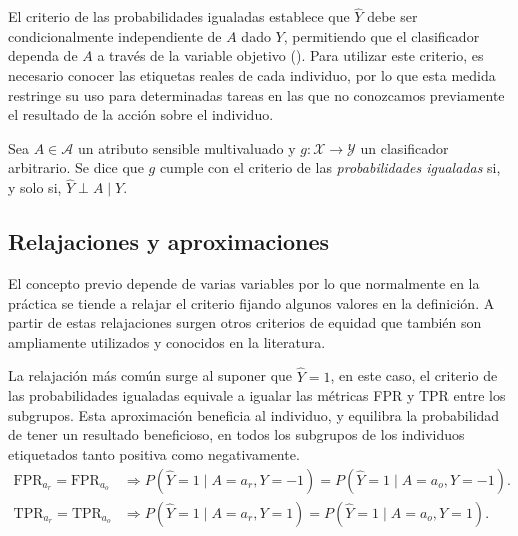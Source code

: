\documentclass[oneside,openright,titlepage,numbers=noenddot,openany,headinclude,footinclude=true,
cleardoublepage=empty,abstractoff,BCOR=5mm,paper=a4,fontsize=12pt,main=spanish]{scrreprt}
\begin{document}
El criterio de las probabilidades igualadas establece que $\hat{Y}$ debe ser condicionalmente independiente de $A$ dado $Y$, permitiendo que el clasificador dependa de $A$ a través de la variable objetivo (\cite{eodd2016}). Para utilizar este criterio, es necesario conocer las etiquetas reales de cada individuo, por lo que esta medida restringe su uso para determinadas tareas en las que no conozcamos previamente el resultado de la acción sobre el individuo.\\

\begin{definition} \label{def:probigual}
Sea $A \in \mathcal{A}$ un atributo sensible multivaluado y $g\colon \mathcal{X} \to \mathcal{Y}$ un clasificador arbitrario. Se dice que $g$ cumple con el criterio de las \textit{probabilidades igualadas} si, y solo si, $\hat{Y} \perp A \mid Y$.
\end{definition}

\subsection*{Relajaciones y aproximaciones}

El concepto previo depende de varias variables por lo que normalmente en la práctica se tiende a relajar el criterio fijando algunos valores en la definición. A partir de estas relajaciones surgen otros criterios de equidad que también son ampliamente utilizados y conocidos en la literatura.

La relajación más común surge al suponer que $\hat{Y}=1$, en este caso, el criterio de las probabilidades igualadas equivale a igualar las métricas FPR y TPR entre los subgrupos. Esta aproximación beneficia al individuo, y equilibra la probabilidad de tener un resultado beneficioso, en todos los subgrupos de los individuos etiquetados tanto positiva como negativamente.
\begin{equation*}
\begin{split}
\text{FPR}_{a_r}=\text{FPR}_{a_o} &\Rightarrow P(\hat{Y}=1 \mid A=a_r,Y=-1)=P(\hat{Y}=1 \mid A=a_o, Y=-1).\\
\text{TPR}_{a_r}=\text{TPR}_{a_o} &\Rightarrow P(\hat{Y}=1 \mid A=a_r, Y=1)=P(\hat{Y}=1 \mid A=a_o, Y=1).
\end{split}
\end{equation*}
\end{document}
